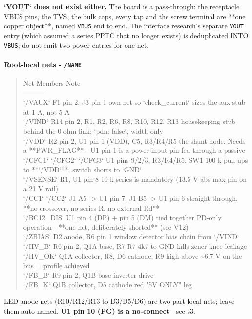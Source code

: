 \documentclass[11pt,a4paper]{article}
\begin{document}
\textbf{`VOUT` does not exist either.} The board is a pass-through: the receptacle VBUS pins, the TVS, the bulk caps, every tap and the screw terminal are {*}{*}one copper object{*}{*}, named \texttt{VBUS} end to end. The interface research's separate \texttt{VOUT} entry (which assumed a series PPTC that no longer exists) is deduplicated INTO \texttt{VBUS}; do not emit two power entries for one net.

\paragraph*{Root-local nets - \texttt{/NAME}}
\begin{quote}\small\ttfamily\raggedright
\textbar{} Net \textbar{} Members \textbar{} Note \textbar{}\\
\textbar{}---\textbar{}---\textbar{}---\textbar{}\\
\textbar{} `/VAUX` \textbar{} F1 pin 2, J3 pin 1 \textbar{} own net so `check\_current` sizes the aux stub at 1 A, not 5 A \textbar{}\\
\textbar{} `/VIND` \textbar{} R14 pin 2, R1, R2, R6, R8, R10, R12, R13 \textbar{} housekeeping stub behind the 0 ohm link; `pdn: false`, width-only \textbar{}\\
\textbar{} `/VDD` \textbar{} R2 pin 2, U1 pin 1 (VDD), C5, R3/R4/R5 \textbar{} the shunt node. Needs a {*}{*}PWR\_FLAG{*}{*} - U1 pin 1 is a power-input pin fed through a passive \textbar{}\\
\textbar{} `/CFG1` `/CFG2` `/CFG3` \textbar{} U1 pins 9/2/3, R3/R4/R5, SW1 \textbar{} 100 k pull-ups to {*}{*}`/VDD`{*}{*}, switch shorts to `GND` \textbar{}\\
\textbar{} `/VSENSE` \textbar{} R1, U1 pin 8 \textbar{} 10 k series is mandatory (13.5 V abs max pin on a 21 V rail) \textbar{}\\
\textbar{} `/CC1` `/CC2` \textbar{} J1 A5 -\textgreater{} U1 pin 7, J1 B5 -\textgreater{} U1 pin 6 \textbar{} straight through, {*}{*}no crossover, no series R, no external Rd{*}{*} \textbar{}\\
\textbar{} `/BC12\_DIS` \textbar{} U1 pin 4 (DP) + pin 5 (DM) tied together \textbar{} PD-only operation - {*}{*}one net, deliberately shorted{*}{*} (see V12) \textbar{}\\
\textbar{} `/ZBIAS` \textbar{} D2 anode, R6 pin 1 \textbar{} window detector bias chain from `/VIND` \textbar{}\\
\textbar{} `/HV\_B` \textbar{} R6 pin 2, Q1A base, R7 \textbar{} R7 4k7 to GND kills zener knee leakage \textbar{}\\
\textbar{} `/HV\_OK` \textbar{} Q1A collector, R8, D6 cathode, R9 \textbar{} high above \textasciitilde{}6.7 V on the bus = profile achieved \textbar{}\\
\textbar{} `/FB\_B` \textbar{} R9 pin 2, Q1B base \textbar{} inverter drive \textbar{}\\
\textbar{} `/FB\_K` \textbar{} Q1B collector, D5 cathode \textbar{} red "5V ONLY" leg \textbar{}
\end{quote}
LED anode nets (R10/R12/R13 to D3/D5/D6) are two-part local nets; leave them auto-named. \textbf{U1 pin 10 (PG) is a no-connect} - see s3.
\end{document}
